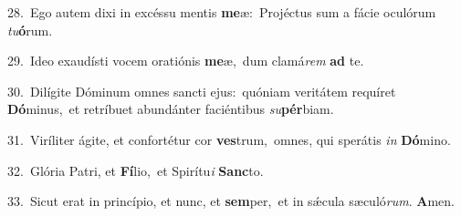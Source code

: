 {\numbfont\textcolor{\numbcolor}{28.}}~Ego autem dixi in excéssu mentis \textbf{me}\-æ:~\star Projéctus sum a fácie oculórum \textit{tu}\-\textbf{ó}rum.\par
{\numbfont\textcolor{\numbcolor}{29.}}~Ideo exaudísti vocem oratiónis \textbf{me}\-æ,~\star dum clamá\textit{rem} \textbf{ad} te.\par
{\numbfont\textcolor{\numbcolor}{30.}}~Dilígite Dóminum omnes sancti ejus:~\dagger quóniam veritátem requíret \textbf{Dó}\-minus,~\star et retríbuet abundánter faciéntibus \textit{su}\-\textbf{pér}biam.\par
{\numbfont\textcolor{\numbcolor}{31.}}~Viríliter ágite, et confortétur cor \textbf{ves}\-trum,~\star omnes, qui sperátis \textit{in} \textbf{Dó}\-mino.\par
{\numbfont\textcolor{\numbcolor}{32.}}~Glória Patri, et \textbf{Fí}\-lio,~\star et Spirítu\textit{i} \textbf{Sanc}\-to.\par
{\numbfont\textcolor{\numbcolor}{33.}}~Sicut erat in princípio, et nunc, et \textbf{sem}\-per,~\star et in sǽcula sæculó\-\textit{rum}\-. \textbf{A}\-men.\par
